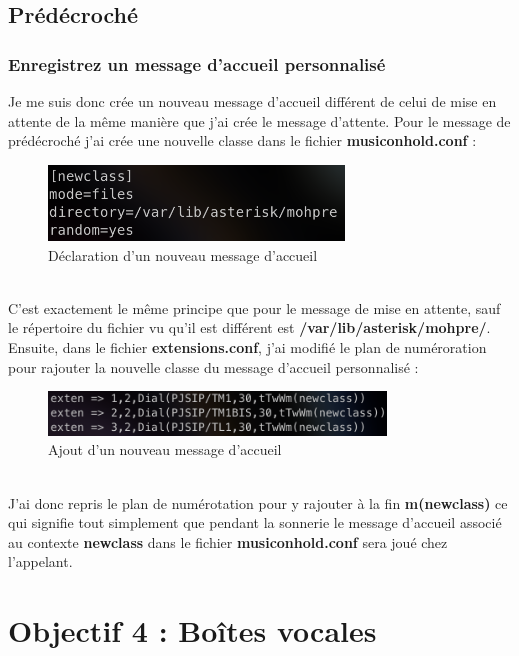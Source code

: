 \documentclass[12pt, a4paper]{article}
\begin{document}
	\newpage
	\subsection{Prédécroché}
	\subsubsection{Enregistrez un message d'accueil personnalisé}
	Je me suis donc crée un nouveau message d'accueil différent de celui de mise
	en attente de la même manière que j'ai crée le message d'attente. Pour le message 
	de prédécroché j'ai crée une nouvelle classe dans le fichier \textbf{musiconhold.conf} :
	\begin{figure}[h]
		\centering
		\includegraphics[width=0.7\textwidth]{img/pre.png}
		\caption{Déclaration d'un nouveau message d'accueil}
		\label{fig:new}
	\end{figure}\\
	C'est exactement le même principe que pour le message de mise en attente, 
	sauf le répertoire du fichier vu qu'il est différent est \textbf{/var/lib/asterisk/mohpre/}.
	Ensuite, dans le fichier \textbf{extensions.conf}, j'ai modifié le plan de numéroration
	pour rajouter la nouvelle classe du message d'accueil personnalisé : 
	\begin{figure}[h]
		\centering
		\includegraphics[width=0.8\textwidth]{img/prex.png}
		\caption{Ajout d'un nouveau message d'accueil}
		\label{fig:nexw}
	\end{figure}\\
	J'ai donc repris le plan de numérotation pour y rajouter à la fin 
	\textbf{m(newclass)} ce qui signifie tout simplement que pendant la sonnerie
	le message d'accueil associé au contexte \textbf{newclass} dans
	le fichier \textbf{musiconhold.conf} sera joué chez l'appelant.\\

\newpage
\section{Objectif 4 : Boîtes vocales}
\end{document}

